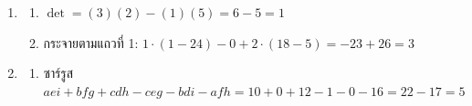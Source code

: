 \begin{enumerate}[label={},leftmargin=0pt,start=5]
    \item
    \begin{enumerate}[label=\textbf{\thechapter.\arabic{enumi}.\arabic*}]
        \item $\det = (3)(2)-(1)(5) = 6-5 = 1$
        \item กระจายตามแถวที่ 1: $1\cdot(1-24) - 0 + 2\cdot(18-5) = -23 + 26 = 3$
    \end{enumerate}
    \item
    \begin{enumerate}[label=\textbf{\thechapter.\arabic{enumi}.\arabic*}]
        \item ซาร์รูส $aei+bfg+cdh-ceg-bdi-afh = 10+0+12-1-0-16 = 22-17 = 5$
    \end{enumerate}
\end{enumerate}

